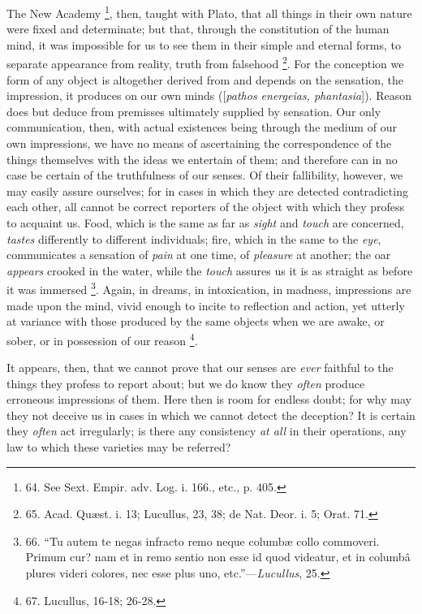 The New Academy \footnote{64. See Sext. Empir. adv. Log.
i. 166., etc., p. 405.}, then, taught with Plato, that all things in their own nature
were fixed and determinate; but that, through the constitution of the
human mind, it was impossible for us to see them in their simple and
eternal forms, to separate appearance from reality, truth from
falsehood \footnote{65. Acad. Quæst. i. 13;
Lucullus, 23, 38; de Nat. Deor. i. 5; Orat. 71.}. For the
conception we form of any object is altogether derived from and
depends on the sensation, the impression, it produces on our own minds
([\emph{pathos energeias, phantasia}]). Reason does but deduce from
premisses ultimately supplied by sensation. Our only communication,
then, with actual existences being through the medium of our own
impressions, we have no means of ascertaining the correspondence of
the things themselves with the ideas we entertain of them; and
therefore can in no case be certain of the truthfulness of our senses.
Of their fallibility, however, we may easily assure ourselves; for in
cases in which they are detected contradicting each other, all cannot
be correct reporters of the object with which they profess to acquaint
us. Food, which is the same as far as \emph{sight} and \emph{touch}
are concerned, \emph{tastes} differently to different individuals;
fire, which in the same to the \emph{eye}, communicates a sensation of
\emph{pain} at one time, of \emph{pleasure} at another; the oar \emph{appears}
crooked in the water, while the \emph{touch} assures us it is as straight as
before it was immersed \footnote{66. ``Tu autem te negas
infracto remo neque columbæ collo commoveri. Primum cur? nam et in
remo sentio non esse id quod videatur, et in columbâ plures videri
colores, nec esse plus uno, etc.''—\emph{Lucullus}, 25.}.
Again, in dreams, in intoxication, in madness, impressions are made
upon the mind, vivid enough to incite to reflection and action, yet
utterly at variance with those produced by the same objects when
we are awake, or sober, or in possession of our reason \footnote{67. Lucullus, 16-18; 26-28.}.

It appears, then, that we
cannot prove that our senses are \emph{ever} faithful to the things
they profess to report about; but we do know they \emph{often} produce
erroneous impressions of them. Here then is room for endless doubt;
for why may they not deceive us in cases in which we cannot detect the
deception? It is certain they \emph{often} act irregularly; is there
any consistency \emph{at all} in their operations, any law to which
these varieties may be referred?

